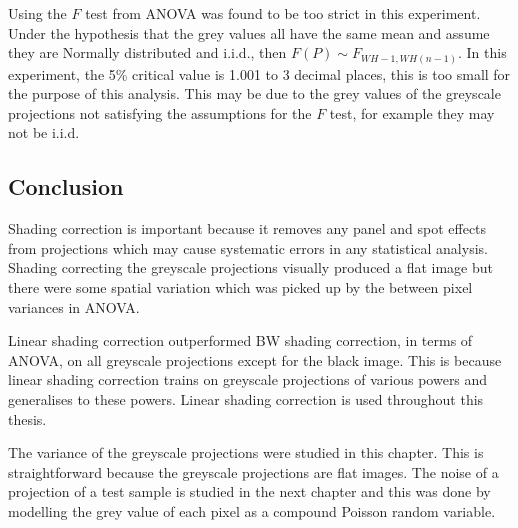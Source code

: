 Using the $F$ test from ANOVA was found to be too strict in this experiment. Under the hypothesis that the grey values all have the same mean and assume they are Normally distributed and i.i.d., then $F(P)\sim F_{WH-1,WH(n-1)}$. In this experiment, the 5\% critical value is 1.001 to 3 decimal places, this is too small for the purpose of this analysis. This may be due to the grey values of the greyscale projections not satisfying the assumptions for the $F$ test, for example they may not be i.i.d.

\subsection{Conclusion}

Shading correction is important because it removes any panel and spot effects from projections which may cause systematic errors in any statistical analysis. Shading correcting the greyscale projections visually produced a flat image but there were some spatial variation which was picked up by the between pixel variances in ANOVA.

Linear shading correction outperformed BW shading correction, in terms of ANOVA, on all greyscale projections except for the black image. This is because linear shading correction trains on greyscale projections of various powers and generalises to these powers. Linear shading correction is used throughout this thesis.

The variance of the greyscale projections were studied in this chapter. This is straightforward because the greyscale projections are flat images. The noise of a projection of a test sample is studied in the next chapter and this was done by modelling the grey value of each pixel as a compound Poisson random variable.